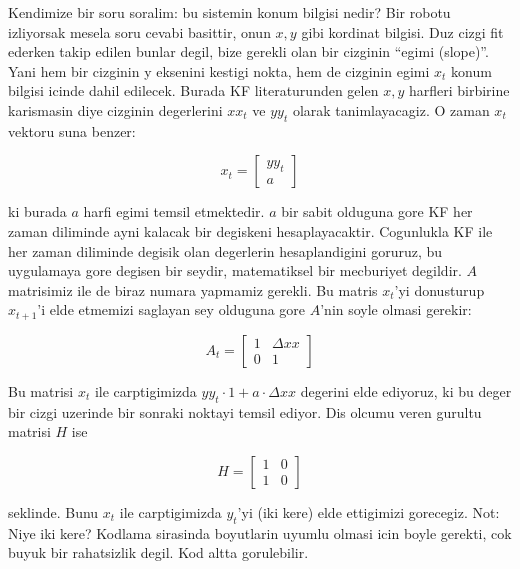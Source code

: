 \documentclass[12pt,fleqn]{article}\usepackage{../common}
\begin{document}
Kendimize bir soru soralim: bu sistemin konum bilgisi nedir? Bir robotu
izliyorsak mesela soru cevabi basittir, onun $x, y$ gibi kordinat
bilgisi. Duz cizgi fit ederken takip edilen bunlar degil, bize gerekli olan
bir cizginin ``egimi (slope)''. Yani hem bir cizginin y eksenini kestigi
nokta, hem de cizginin egimi $x_t$ konum bilgisi icinde dahil edilecek. Burada
KF literaturunden gelen $x, y$ harfleri birbirine karismasin diye cizginin
degerlerini $xx_t$ ve $yy_t$ olarak tanimlayacagiz. O zaman $x_t$ vektoru suna
benzer:

\[ x_t = 
\left[\begin{array}{r}
yy_t \\
a
\end{array}\right]
 \]

ki burada $a$ harfi egimi temsil etmektedir. $a$ bir sabit olduguna gore
KF her zaman diliminde ayni kalacak bir degiskeni
hesaplayacaktir. Cogunlukla KF ile her zaman diliminde degisik olan
degerlerin hesaplandigini goruruz, bu uygulamaya gore degisen bir seydir,
matematiksel bir mecburiyet degildir. $A$ matrisimiz ile de biraz numara
yapmamiz gerekli. Bu matris $x_t$'yi donusturup $x_{t+1}$'i elde etmemizi
saglayan sey olduguna gore $A$'nin soyle olmasi gerekir:

\[ 
A_t = 
\left[\begin{array}{rr}
1 & \Delta xx \\
0 & 1
\end{array}\right]
 \]

Bu matrisi $x_t$ ile carptigimizda $yy_t \cdot 1 + a \cdot \Delta xx$
degerini elde ediyoruz, ki bu deger bir cizgi uzerinde bir sonraki noktayi
temsil ediyor. Dis olcumu veren gurultu matrisi $H$ ise

\[ H =
\left[\begin{array}{rr}
1 & 0 \\
1 & 0
\end{array}\right]
 \]

seklinde. Bunu $x_t$ ile carptigimizda $y_t$'yi (iki kere) elde ettigimizi
gorecegiz.  Not: Niye iki kere? Kodlama sirasinda boyutlarin uyumlu olmasi
icin boyle gerekti, cok buyuk bir rahatsizlik degil. Kod altta
gorulebilir.
\end{document}
